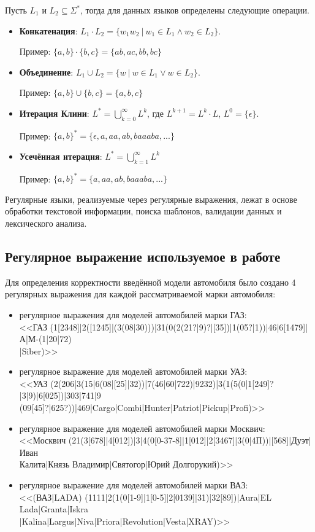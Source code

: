 \documentclass[a4paper,final]{article}
\begin{document}
Пусть $L_1 \text{ и } L_2 \subseteq \Sigma^*$, тогда для данных языков определены следующие операции.

\begin{itemize}
    \item \textbf{Конкатенация}: $L_1 \cdot L_2 = \{ w_1w_2 ~|~ w_1 \in L_1 \wedge w_2 \in L_2 \}$.

    Пример: $\{ a, b \} \cdot \{ b, c \} = \{ ab, ac, bb, bc\}$
    \item \textbf{Объединение}: $L_1 \cup L_2 = \{ w ~|~ w \in L_1 \vee w \in L_2 \}$.

    Пример: $\{ a, b \} \cup \{ b, c \} = \{ a, b, c \}$
    \item \textbf{Итерация Клини}: $L^* = \bigcup_{k=0}^\infty L^k$, где $L^{k+1} = L^k \cdot L$, $L^0 = \{ \epsilon \}$.

    Пример: $\{a, b\}^* = \{\epsilon, a, aa, ab, baaaba, ...\}$
    \item \textbf{Усечённая итерация}: $L^* = \bigcup_{k=1}^\infty L^k$

    Пример: $\{a, b\}^* = \{a, aa, ab, baaaba, ...\}$
\end{itemize}

Регулярные языки, реализуемые через регулярные выражения, лежат в основе обработки текстовой информации, поиска шаблонов, валидации данных и лексического анализа.

\subsection{Регулярное выражение используемое в работе}
Для определения корректности введённой модели автомобиля было создано 4 регулярных выражения для каждой рассматриваемой марки автомобиля:
\begin{itemize}
    \item регулярное выражения для моделей автомобилей марки ГАЗ:\\[0.7em]
    <<ГАЗ (1[2348]|2([1245]|(3(08|30)))|31(0(2(21?|9)?|[35])|1(05?|1))|46|6[1479]|А|М-(1|20|72)\\|Siber)>>
    \item регулярное выражение для моделей автомобилей марки УАЗ:\\[0.7em]
    <<УАЗ (2(206|3(15|6(08|[25]|32))|7(46|60|722)|9232)|3(1(5(0|1[249]?|3|9)|6[025])|303|741|9\\(09[45]?|625?))|469|Cargo|Combi|Hunter|Patriot|Pickup|Profi)>>
    \item регулярное выражение для моделей автомобилей марки Москвич:\\[0.7em]
    <<Москвич (21(3[678]|4[012])|3|4(0[0-37-8]|1[012]|2[3467]|3(0|4П))|[568]|Дуэт|Иван \\Калита|Князь Владимир|Святогор|Юрий Долгорукий)>>
    \item регулярное выражение для моделей автомобилей марки ВАЗ:\\[0.7em]
    <<(ВАЗ|LADA) (1111|2(1(0[1-9]|1[0-5]|2[0139]|31)|32[89])|Aura|EL Lada|Granta|Iskra\\|Kalina|Largus|Niva|Priora|Revolution|Vesta|XRAY)>>
    
\end{itemize}
\end{document}
